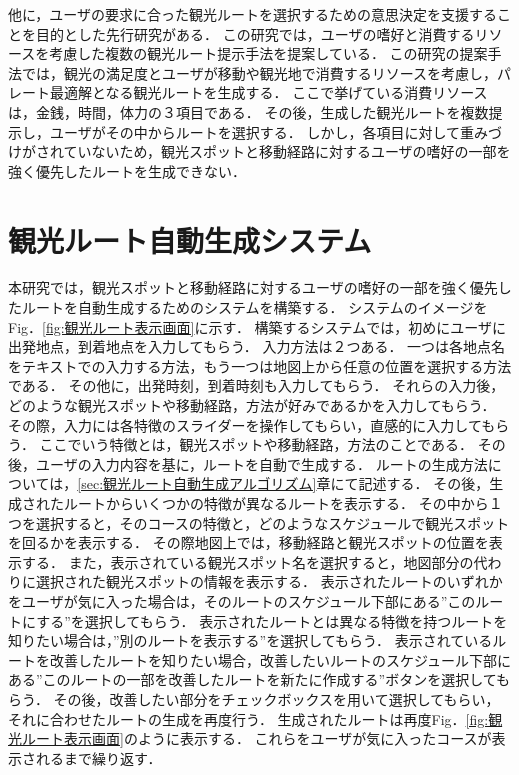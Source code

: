 他に，ユーザの要求に合った観光ルートを選択するための意思決定を支援することを目的とした先行研究がある\cite{平野}．
この研究では，ユーザの嗜好と消費するリソースを考慮した複数の観光ルート提示手法を提案している．
この研究の提案手法では，観光の満足度とユーザが移動や観光地で消費するリソースを考慮し，パレート最適解となる観光ルートを生成する．
ここで挙げている消費リソースは，金銭，時間，体力の３項目である．
その後，生成した観光ルートを複数提示し，ユーザがその中からルートを選択する．
しかし，各項目に対して重みづけがされていないため，観光スポットと移動経路に対するユーザの嗜好の一部を強く優先したルートを生成できない．

\section{観光ルート自動生成システム}\label{sec:観光ルート自動生成システム}
本研究では，観光スポットと移動経路に対するユーザの嗜好の一部を強く優先したルートを自動生成するためのシステムを構築する．
システムのイメージをFig．\ref{fig:観光ルート表示画面}に示す．
構築するシステムでは，初めにユーザに出発地点，到着地点を入力してもらう．
入力方法は２つある．
一つは各地点名をテキストでの入力する方法，もう一つは地図上から任意の位置を選択する方法である．
その他に，出発時刻，到着時刻も入力してもらう．
それらの入力後，どのような観光スポットや移動経路，方法が好みであるかを入力してもらう．
その際，入力には各特徴のスライダーを操作してもらい，直感的に入力してもらう．
ここでいう特徴とは，観光スポットや移動経路，方法のことである．
その後，ユーザの入力内容を基に，ルートを自動で生成する．
ルートの生成方法については，\ref{sec:観光ルート自動生成アルゴリズム}章にて記述する．
その後，生成されたルートからいくつかの特徴が異なるルートを表示する．
その中から１つを選択すると，そのコースの特徴と，どのようなスケジュールで観光スポットを回るかを表示する．
その際地図上では，移動経路と観光スポットの位置を表示する．
また，表示されている観光スポット名を選択すると，地図部分の代わりに選択された観光スポットの情報を表示する．
表示されたルートのいずれかをユーザが気に入った場合は，そのルートのスケジュール下部にある”このルートにする”を選択してもらう．
表示されたルートとは異なる特徴を持つルートを知りたい場合は，”別のルートを表示する”を選択してもらう．
表示されているルートを改善したルートを知りたい場合，改善したいルートのスケジュール下部にある”このルートの一部を改善したルートを新たに作成する”ボタンを選択してもらう．
その後，改善したい部分をチェックボックスを用いて選択してもらい，それに合わせたルートの生成を再度行う．
生成されたルートは再度Fig．\ref{fig:観光ルート表示画面}のように表示する．
これらをユーザが気に入ったコースが表示されるまで繰り返す．
